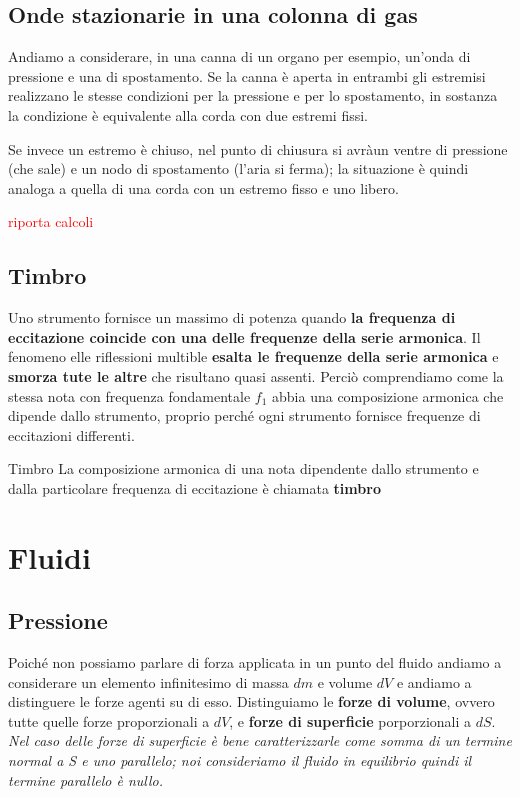 \documentclass[x11names]{article}
\begin{document}
		\subsection{Onde stazionarie in una colonna di gas}
		Andiamo a considerare, in una canna di un organo per esempio, un'onda di pressione e una di spostamento. Se la canna è aperta in entrambi gli estremisi realizzano le stesse condizioni per la pressione e per lo spostamento, in sostanza la condizione è equivalente alla corda con due estremi fissi.
		
		Se invece un estremo è chiuso, nel punto di chiusura si avràun ventre di pressione (che sale) e un nodo di spostamento (l'aria si ferma); la situazione è quindi analoga a quella di una corda con un estremo fisso e uno libero.
		
		\begin{center}
			\textcolor{red}{riporta calcoli}
		\end{center}
		
		\subsection{Timbro}
		Uno strumento fornisce un massimo di potenza quando \textbf{la frequenza di eccitazione coincide con una delle frequenze della serie armonica}. Il fenomeno elle riflessioni multible \textbf{esalta le frequenze della serie armonica} e \textbf{smorza tute le altre} che risultano quasi assenti. Perciò comprendiamo come la stessa nota con frequenza fondamentale \(f_1\) abbia una composizione armonica che dipende dallo strumento, proprio perché ogni strumento fornisce frequenze di eccitazioni differenti.
		
		\begin{center}
			\colorbox{yblue}{\begin{minipage}{5.75in}
					\begin{blues}{Timbro}
						La composizione armonica di una nota dipendente dallo strumento e dalla particolare frequenza di eccitazione è chiamata \textbf{timbro}
					\end{blues}
			\end{minipage}}
		\end{center}
		
	
			
	
\newpage
\section{Fluidi}
	\subsection{Pressione}
	Poiché non possiamo parlare di forza applicata in un punto del fluido andiamo a considerare un elemento infinitesimo di massa \(dm\) e volume \(dV\) e andiamo a distinguere le forze agenti su di esso. Distinguiamo le \textbf{forze di volume}, ovvero tutte quelle forze proporzionali a \(dV\), e \textbf{forze di superficie} porporzionali a \(dS\). \textit{Nel caso delle forze di superficie è bene caratterizzarle come somma di un termine normal a S e uno parallelo; noi consideriamo il fluido in equilibrio quindi il termine parallelo è nullo.}
	
\end{document}
